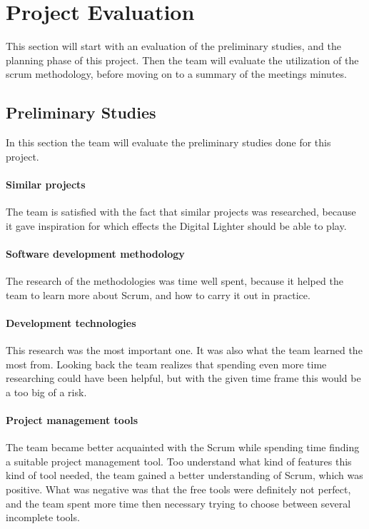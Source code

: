 \section{Project Evaluation}
This section will start with an evaluation of the preliminary studies, and the planning phase of this project.  
Then the team will evaluate the utilization of the scrum methodology, before moving on to a summary of the meetings minutes. 

\subsection{Preliminary Studies}
In this section the team will evaluate the preliminary studies done for this project.
\paragraph{Similar projects} 
The team is satisfied with the fact that similar projects was researched, because it gave inspiration for which effects the Digital Lighter should be able to play. 

\paragraph{Software development methodology}
The research of the methodologies was time well spent, because it helped the team to learn more about Scrum, and how to carry it out in practice.

\paragraph{Development technologies}
This research was the most important one. It was also what the team learned the most from. Looking back the team realizes that spending even more time researching could have been helpful, but with the given time frame this would be a too big of a risk.

\paragraph{Project management tools}
The team became better acquainted with the Scrum while spending time finding a suitable project management tool. Too understand what kind of features this kind of tool needed, the team gained a better understanding of Scrum, which was positive. What was negative was that the free tools were definitely not perfect, and the team spent more time then necessary trying to choose between several incomplete tools. 

